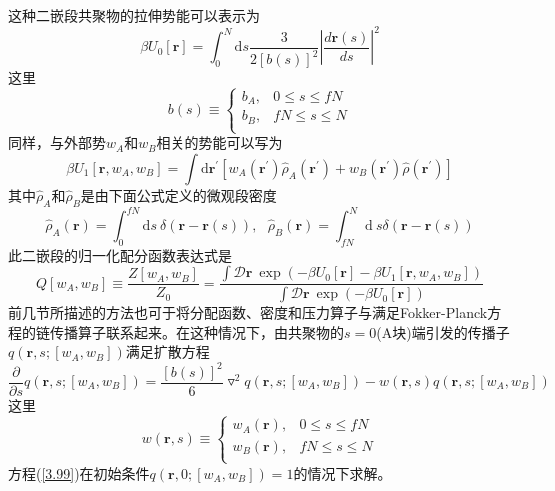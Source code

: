 这种二嵌段共聚物的拉伸势能可以表示为
\begin{equation}
\beta U_0[\mathbf{r}]=\int_{0}^{N} \mathrm{d}s\frac{3}{2[b(s)]^2}\left| \frac{d\mathbf{r}(s)}{ds} \right|^2
\end{equation}
这里
\begin{equation}
b(s)\equiv
\begin{cases}
b_A, & 0\leq s \leq fN \\
b_B, & fN \leq s \leq N\\
\end{cases}
\end{equation}
同样，与外部势$w_A$和$w_B$相关的势能可以写为
\begin{equation}
\beta U_1[\mathbf{r},w_A,w_B]=\int \mathrm{d}\mathbf{r}^{'}[w_A(\mathbf{r}^{'})\hat{\rho}_{A}(\mathbf{r}^{'})+w_B(\mathbf{r}^{'})\hat{\rho}(\mathbf{r}^{'})]
\end{equation}
其中$\hat{\rho} _A$和$\hat{\rho} _B$是由下面公式定义的微观段密度
\begin{equation}
\hat{\rho} _A(\mathbf{r})=\int _0^{fN} \mathrm{d}s~\delta(\mathbf{r}-\mathbf{r}(s)),~~~\hat{\rho} _B(\mathbf{r})=\int _{fN}^{N} \mathrm{d}~s\delta(\mathbf{r}-\mathbf{r}(s))
\end{equation}
此二嵌段的归一化配分函数表达式是
\begin{equation}
Q[w_A,w_B]\equiv\frac{Z[w_A,w_B]}{Z_0}=\frac{\int \mathcal{D}\mathbf{r}~\exp(-\beta U_0[\mathbf{r}]-\beta U_1[\mathbf{r},w_A,w_B])}{\int \mathcal{D}\mathbf{r}~\exp(-\beta U_0[\mathbf{r}])}
\end{equation}
前几节所描述的方法也可于将分配函数、密度和压力算子与满足Fokker-Planck方程的链传播算子联系起来。在这种情况下，由共聚物的$s=0$(A块)端引发的传播子$q(\mathbf{r},s;[w_A,w_B])$满足扩散方程
\begin{equation}
\frac{\partial}{\partial s}q(\mathbf{r},s;[w_A,w_B])=\frac{[b(s)]^2}{6}\triangledown ^2q(\mathbf{r},s;[w_A,w_B])-w(\mathbf{r},s)q(\mathbf{r},s;[w_A,w_B]) \label{3.99}
\end{equation}
这里
\begin{equation}
w(\mathbf{r},s)\equiv
\begin{cases}
w_A(\mathbf{r}), & 0\leq s \leq fN \\
w_B(\mathbf{r}), & fN \leq s \leq N\\
\end{cases}
\end{equation}
方程(\ref{3.99})在初始条件$q(\mathbf{r},0;[w_A,w_B])=1$的情况下求解。

